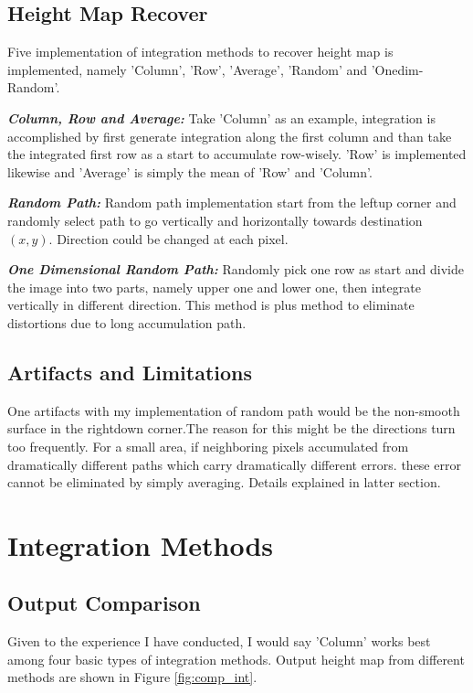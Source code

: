 \documentclass[a4paper]{article}
\begin{document}
\subsection{Height Map Recover}
Five implementation of integration methods to recover height map is implemented, namely 'Column', 'Row', 'Average', 'Random' and 'Onedim-Random'.

{\bfseries{\em Column, Row and Average:}} Take 'Column' as an example, integration is accomplished by first generate integration along the first column and than take the integrated first row as a start to accumulate row-wisely. 'Row' is implemented likewise and 'Average' is simply the mean of 'Row' and 'Column'.

{\bfseries{\em Random Path:}} Random path implementation start from the leftup corner and randomly select path to go vertically and horizontally towards destination $(x,y)$. Direction could be changed at each pixel.

{\bfseries{\em One Dimensional Random Path:}} Randomly pick one row as start and divide the image into two parts, namely upper one and lower one, then integrate vertically in different direction. This method is plus method to eliminate distortions due to long accumulation path.

\subsection{Artifacts and Limitations}
One artifacts with my implementation of random path would be the non-smooth surface in the rightdown corner.The reason for this might be the directions turn too frequently. For a small area, if neighboring pixels accumulated from dramatically different paths which carry dramatically different errors. these error cannot be eliminated by simply averaging. Details explained in latter section.

\section{Integration Methods}
\label{sec:integration}

\subsection{Output Comparison}
Given to the experience I have conducted, I would say 'Column' works best among four basic types of integration methods. Output height map from different methods are shown in Figure \ref{fig:comp_int}.
\end{document}

